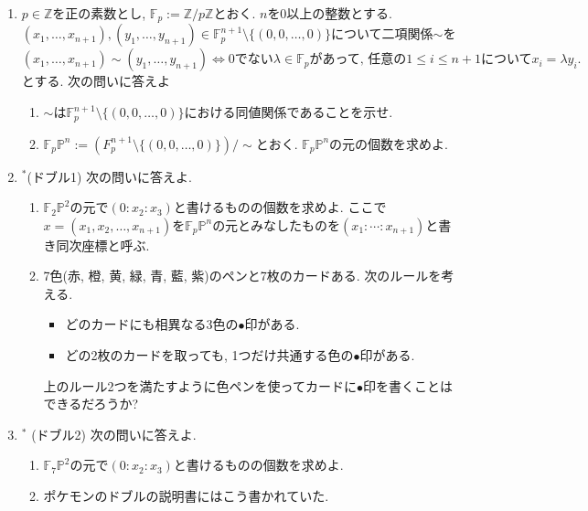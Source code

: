 \documentclass[dvipdfmx,a4paper,11pt]{article}
\newcommand{\Z}{\mathbb{Z}}
\theoremstyle{definition}
\begin{document}
\begin{enumerate}[label=\textbf{問}\ref*{sec-6}.\arabic*]
\item $p \in \Z$を正の素数とし, $\mathbb{F}_p :=\Z/p\Z $とおく.
$n$を0以上の整数とする. 
$(x_1, \ldots, x_{n+1}), (y_1, \ldots, y_{n+1}) \in \mathbb{F}_{p}^{n+1}\setminus \{ (0,0,\ldots, 0)\}$について二項関係$\sim$を
$$
(x_1, \ldots, x_{n+1}) \sim (y_1, \ldots, y_{n+1})  \Leftrightarrow \text{$0$でない$\lambda \in \mathbb{F}_p$があって, 任意の$1\le i \le n+1$について$x_i = \lambda y_i$.}
$$
とする.
次の問いに答えよ
    \begin{enumerate}[label=(\arabic*).]
 \setlength{\parskip}{0cm}
  \setlength{\itemsep}{0pt}
  \item $\sim$は$ \mathbb{F}_{p}^{n+1}\setminus \{ (0,0,\ldots, 0)\}$における同値関係であることを示せ.
  \item $\mathbb{F}_{p}\mathbb{P}^n:=(F_{p}^{n+1}\setminus \{ (0,0,\ldots, 0)\})/\sim$とおく. $\mathbb{F}_{p}\mathbb{P}^n$の元の個数を求めよ. 
  \end{enumerate}
  
\item $^*$(ドブル1)
次の問いに答えよ.
    \begin{enumerate}[label=(\arabic*).]
 \setlength{\parskip}{0cm}
  \setlength{\itemsep}{0pt}
  \item $\mathbb{F}_{2}\mathbb{P}^2$の元で$(0: x_2 : x_3)$と書けるものの個数を求めよ. ここで$x= (x_{1}, x_{2}, \ldots, x_{n+1})$を$\mathbb{F}_{p}\mathbb{P}^n$の元とみなしたものを$(x_{1}: \cdots : x_{n+1})$と書き同次座標と呼ぶ.
  \item 7色(赤, 橙, 黄, 緑, 青, 藍, 紫)のペンと7枚のカードある. 
 次のルールを考える. 
 \begin{itemize}
 \setlength{\parskip}{0cm}
  \setlength{\itemsep}{0pt}
  \item どのカードにも相異なる3色の$\bullet$印がある.
  \item どの2枚のカードを取っても, 1つだけ共通する色の$\bullet$印がある.
\end{itemize}
上のルール2つを満たすように色ペンを使ってカードに$\bullet$印を書くことはできるだろうか?
  \end{enumerate}
\item $^*$ (ドブル2)
次の問いに答えよ.
    \begin{enumerate}[label=(\arabic*).]
 \setlength{\parskip}{0cm}
  \setlength{\itemsep}{0pt}
  \item $\mathbb{F}_{7}\mathbb{P}^2$の元で$(0: x_2 : x_3)$と書けるものの個数を求めよ. 
  \item ポケモンのドブルの説明書にはこう書かれていた.  
  

\end{enumerate}
\end{enumerate}
\end{document}
